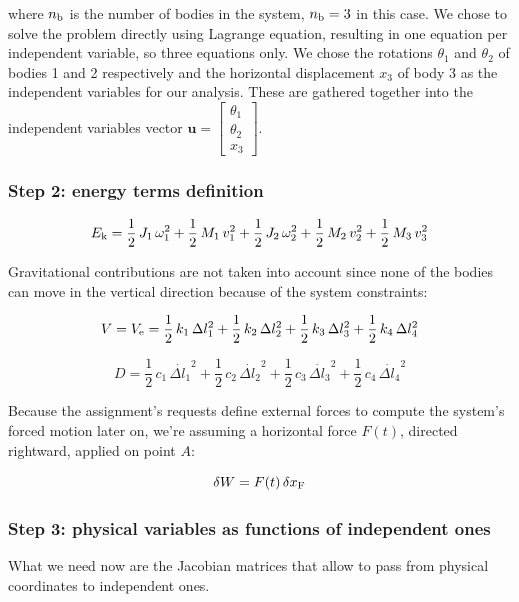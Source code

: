 \documentclass[a4paper,12pt,oneside]{article}
\begin{document}
where $ n_\textup{b} $ is the number of bodies in the system, $ n_\textup{b} = 3 $ in this case. We chose to solve the problem directly using Lagrange equation, resulting in one equation per independent variable, so three equations only. We chose the rotations $ \theta_1 $ and $ \theta_2 $ of bodies 1 and 2 respectively and the horizontal displacement $ x_3 $ of body 3 as the independent variables for our analysis. These are gathered together into the independent variables vector $ \mathbf{u} = \begin{bmatrix} \theta_1 \\ \theta_2 \\ x_3 \end{bmatrix} $.

\subsubsection*{Step 2: energy terms definition}
\label{ssubs:energy_terms}

\[
	E_\textup{k} = \frac{1}{2} \, J_1 \, \omega_1^2 + \frac{1}{2} \, M_1 \, v_1^2 +
		\frac{1}{2} \, J_2 \, \omega_2^2 + \frac{1}{2} \, M_2 \, v_2^2 +
		\frac{1}{2} \, M_3 \, v_3^2
\]

Gravitational contributions are not taken into account since none of the bodies can move in the vertical direction because of the system constraints:

\[
	V = V_\textup{e} = \frac{1}{2} \, k_1 \, \Delta l_1^2 +
		\frac{1}{2} \, k_2 \, \Delta l_2^2 +
		\frac{1}{2} \, k_3 \, \Delta l_3^2 +
		\frac{1}{2} \, k_4 \, \Delta l_4^2
\]

\[
	D = \frac{1}{2} \, c_1 \, \dot{\Delta l_1}^2 +
		\frac{1}{2} \, c_2 \, \dot{\Delta l_2}^2 +
		\frac{1}{2} \, c_3 \, \dot{\Delta l_3}^2 +
		\frac{1}{2} \, c_4 \, \dot{\Delta l_4}^2
\]

Because the assignment's requests define external forces to compute the system's forced motion later on, we're assuming a horizontal force $ F(t) $, directed rightward, applied on point $ A $:

\[ \delta W = F(t) \, \delta x_\textup{F} \]

\subsubsection*{Step 3: physical variables as functions of independent ones}
\label{ssubs:jacobians}

What we need now are the Jacobian matrices that allow to pass from physical coordinates to independent ones.
\end{document}
